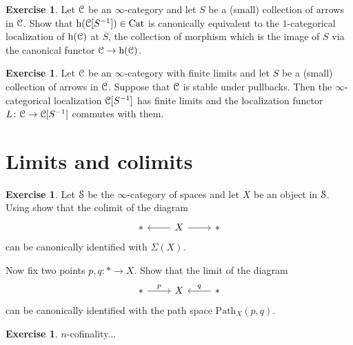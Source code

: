 \documentclass[10pt,a4paper,reqno,oneside]{book} %
\theoremstyle{plain}
\theoremstyle{definition}
\newtheorem{exercise}[thm]{Exercise}
\theoremstyle{remark}
\numberwithin{equation}{section}
\begin{document}
\begin{exercise}
	Let $\mathcal C$ be an $\infty$-category and let $S$ be a (small) collection of arrows in $\mathcal C$.
	Show that $\mathrm h(\mathcal C[S^{-1}]) \in \mathrm{Cat}$ is canonically equivalent to the $1$-categorical localization of $\mathrm h(\mathcal C)$ at $\overline{S}$, the collection of morphism which is the image of $S$ via the canonical functor $\mathcal C \to \mathrm h(\mathcal C)$.
\end{exercise}

\begin{exercise}
	Let $\mathcal C$ be an $\infty$-category with finite limits and let $S$ be a (small) collection of arrows in $\mathcal C$.
	Suppose that $\mathcal C$ is stable under pullbacks.
	Then the $\infty$-categorical localization $\mathcal C[S^{-1}]$ has finite limits and the localization functor $L \colon \mathcal C \to \mathcal C[S^{-1}]$ commutes with them.
\end{exercise}

\section{Limits and colimits}

\begin{exercise}
	Let $\mathcal S$ be the $\infty$-category of spaces and let $X$ be an object in $\mathcal S$.
	Using \cite[Theorem 4.2.4.1]{HTT} show that the colimit of the diagram
	\[ \begin{tikzcd}
		* & X \arrow{l} \arrow{r} & *
	\end{tikzcd} \]
	can be canonically identified with $\Sigma(X)$.
	
	Now fix two points $p, q \colon * \to X$. Show that the limit of the diagram
	\[ \begin{tikzcd}
		* \arrow{r}{p} & X & * \arrow{l}[swap]{q}
	\end{tikzcd} \]
	can be canonically identified with the path space $\mathrm{Path}_X(p,q)$.
\end{exercise}

\begin{exercise}
	$n$-cofinality...
\end{exercise}
\end{document}
